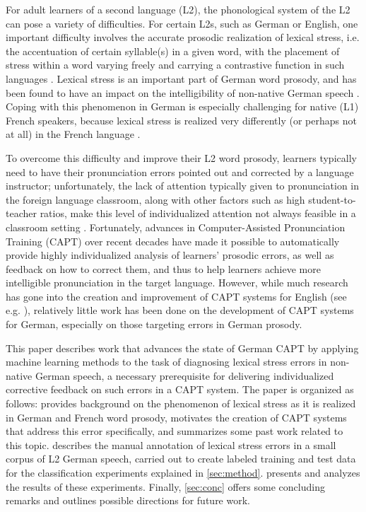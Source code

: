 \documentclass[a4paper]{article}
\begin{document}
  
  For adult learners of a second language (L2), the phonological system of the L2 can pose a variety of difficulties. For certain L2s, such as German or English, one important difficulty involves the accurate prosodic realization of lexical stress, i.e. the accentuation of certain syllable(s) in a given word, with the placement of stress within a word varying freely and carrying a contrastive function in such languages \cite{Cutler2005}. Lexical stress is an important part of German word prosody, and has been found to have an impact on the intelligibility of non-native German speech \cite{Hirschfeld1994}. Coping with this phenomenon in German is especially challenging for native (L1) French speakers, because lexical stress is realized very differently (or perhaps not at all) in the French language \cite{Dupoux2008,Michaux2013}.
  
  To overcome this difficulty and improve their L2 word prosody, learners typically need to have their pronunciation errors pointed out and corrected by a language instructor; unfortunately, the lack of attention typically given to pronunciation in the foreign language classroom, 
  along with other factors such as high student-to-teacher ratios,
  make this level of individualized attention not always feasible in a classroom setting \cite{Neri2002,Derwing2005,Hirschfeld2007}. Fortunately, advances in Computer-Assisted Pronunciation Training (CAPT) over recent decades have made it possible to automatically provide highly individualized analysis of learners' prosodic errors, as well as feedback on how to correct them, and thus to help learners achieve more intelligible pronunciation in the target language. However, while much research has gone into the creation and improvement of CAPT systems for English (see e.g. \cite{Eskenazi2009,Witt2012}), relatively little work has been done on the development of CAPT systems for German, especially on those targeting errors in German prosody.
  
  This paper describes work that advances the state of German CAPT by applying machine learning methods to the task of diagnosing lexical stress errors in non-native German speech, a necessary prerequisite for delivering individualized corrective feedback on such errors in a CAPT system. The paper is organized as follows:  provides background on the phenomenon of lexical stress as it is realized in German and French word prosody, motivates the creation of CAPT systems that address this error specifically, and summarizes some past work related to this topic.  describes the manual annotation of lexical stress errors in a small corpus of L2 German speech, carried out to create labeled training and test data for the classification experiments explained in \cref{sec:method}.  presents and analyzes the results of these experiments. Finally, \cref{sec:conc} offers some concluding remarks and outlines possible directions for future work.
\end{document}
